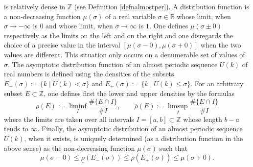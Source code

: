 \documentclass[graybox, envcountsect%
]{svmult}
\def\R{{\mathbb R}}
\def\Z{{\mathbb Z}}
\begin{document}
is relatively dense in $\Z$ (see Definition \ref{defnalmostper}). A distribution function is a non-decreasing function $\mu(\sigma)$ of a real variable $\sigma\in \R$ whose limit, when $\sigma\to -\infty$ is $0$ and whose limit, when $\sigma\to \infty$ is $1$. One defines $\mu(\sigma\pm 0)$ respectively as the limits on the left and on the right and one disregards the choice of a precise value in the interval $[\mu(\sigma-0),\mu(\sigma+0)]$ when the two values are different. This situation only occurs on a denumerable set of values of $\sigma$. The asymptotic distribution function of  an almost periodic sequence $U(k)$ of real numbers is defined using the densities of the subsets   $E_-(\sigma):=\{k\mid U(k)<\sigma\}$ and  $E_+(\sigma):=\{k\mid U(k)\leq\sigma\}$. For an arbitrary subset $E\subset \Z$, one defines first the lower and upper densities by the formulas 
\begin{equation}\label{density}
	\underline{\rho}(E):=\liminf_I \frac{\#\{E\cap I\}}{\#I}, \qquad 
	\overline{\rho}(E):=\limsup_I \frac{\#\{E\cap I\}}{\#I}
\end{equation}
where the limits are taken over all intervals $I=[a,b]\subset \Z$ whose length $b-a$ tends to $\infty$. Finally, the asymptotic distribution of  an almost periodic sequence $U(k)$, when it exists, is uniquely determined (as a distribution function in the above sense) as the non-decreasing function $\mu(\sigma)$ such that 
\begin{equation}\label{density1}
	\mu(\sigma-0)\leq \underline{\rho}(E_-(\sigma))\leq \overline{\rho}(E_+(\sigma)) \leq\mu(\sigma+0).
\end{equation}
\end{document}
